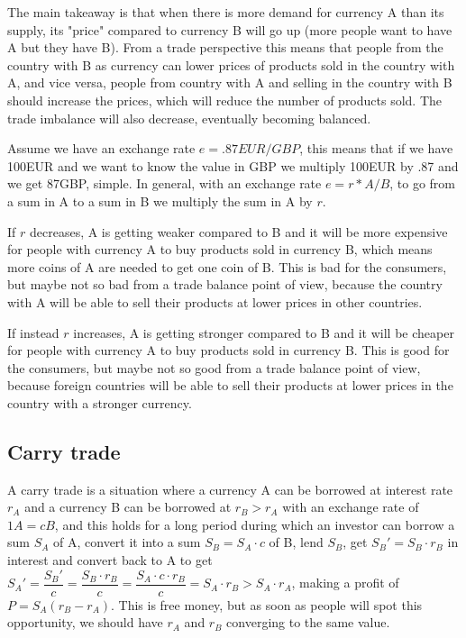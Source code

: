 The main takeaway is that when there is more demand for currency A than its supply, its "price" compared to currency B will go up (more people want to have A but they have B). From a trade perspective this means that people from the country with B as currency can lower prices of products sold in the country with A, and vice versa, people from country with A and selling in the country with B should increase the prices, which will reduce the number of products sold. The trade imbalance will also decrease, eventually becoming balanced.

Assume we have an exchange rate $e = .87EUR/GBP$, this means that if we have 100EUR and we want to know the value in GBP we multiply 100EUR by .87 and we get 87GBP, simple. In general, with an exchange rate $e = r*A/B$, to go from a sum in A to a sum in B we multiply the sum in A by $r$. 

If $r$ decreases, A is getting weaker compared to B and it will be more expensive for people with currency A to buy products sold in currency B, which means more coins of A are needed to get one coin of B. This is bad for the consumers, but maybe not so bad from a trade balance point of view, because the country with A will be able to sell their products at lower prices in other countries.

If instead $r$ increases, A is getting stronger compared to B and it will be cheaper for people with currency A to buy products sold in currency B. This is good for the consumers, but maybe not so good from a trade balance point of view, because foreign countries will be able to sell their products at lower prices in the country with a stronger currency.

\subsection{Carry trade}
A carry trade is a situation where a currency A can be borrowed at interest rate $r_A$ and a currency B can be borrowed at $r_B > r_A$ with an exchange rate of $1 A = c B$, and this holds for a long period during which an investor can borrow a sum $S_A$ of A, convert it into a sum $S_B = S_A \cdot c$ of B, lend $S_B$, get $S_B' = S_B \cdot r_B$ in interest and convert back to A to get $S_A' = \dfrac{S_B'}{c} = \dfrac{S_B \cdot r_B}{c} = \dfrac{S_A \cdot c \cdot r_B}{c} = S_A \cdot r_B > S_A \cdot r_A$, making a profit of $P = S_A(r_B-r_A)$. This is free money, but as soon as people will spot this opportunity, we should have $r_A$ and $r_B$ converging to the same value.

